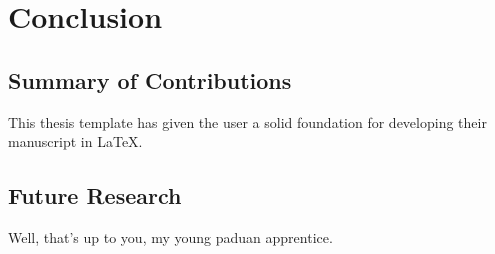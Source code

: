
\chapter{Conclusion}
	\label{chapter:conclusion}%

\section{Summary of Contributions}

This thesis template has given the user a solid foundation for developing their manuscript in \LaTeX.

\section{Future Research}

Well, that's up to you, my young paduan apprentice.

